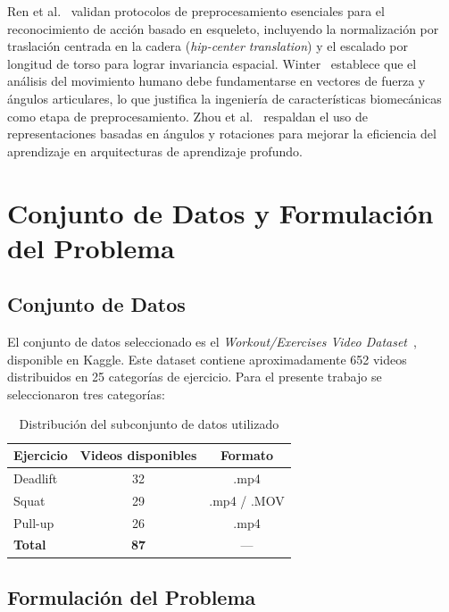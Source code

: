 \documentclass[conference]{IEEEtran}
\begin{document}
Ren et al.~\cite{ren2020survey} validan protocolos de
preprocesamiento esenciales para el reconocimiento de acción
basado en esqueleto, incluyendo la normalización por traslación
centrada en la cadera (\textit{hip-center translation}) y el
escalado por longitud de torso para lograr invariancia espacial.
Winter~\cite{winter2009biomechanics} establece que el análisis del
movimiento humano debe fundamentarse en vectores de fuerza y
ángulos articulares, lo que justifica la ingeniería de
características biomecánicas como etapa de preprocesamiento.
Zhou et al.~\cite{zhou2019continuity} respaldan el uso de
representaciones basadas en ángulos y rotaciones para mejorar la
eficiencia del aprendizaje en arquitecturas de aprendizaje profundo.

\section{Conjunto de Datos y Formulación del Problema}
\label{sec:dataset}

\subsection{Conjunto de Datos}

El conjunto de datos seleccionado es el \textit{Workout/Exercises
Video Dataset}~\cite{kaggle_dataset}, disponible en Kaggle. Este
dataset contiene aproximadamente 652 videos distribuidos en 25
categorías de ejercicio. Para el presente trabajo se seleccionaron
tres categorías:

\begin{table}[htbp]
  \caption{Distribución del subconjunto de datos utilizado}
  \label{tab:dataset}
  \centering
  \begin{tabular}{lcc}
    \toprule
    \textbf{Ejercicio} & \textbf{Videos disponibles} & \textbf{Formato} \\
    \midrule
    Deadlift  & 32 & .mp4 \\
    Squat     & 29 & .mp4 / .MOV \\
    Pull-up   & 26 & .mp4 \\
    \midrule
    \textbf{Total} & \textbf{87} & — \\
    \bottomrule
  \end{tabular}
\end{table}

\subsection{Formulación del Problema}
\end{document}
